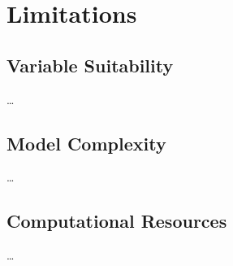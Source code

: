 
\section{Limitations}\label{sec:limitations}
    \subsection{Variable Suitability}\label{subsec:variable-suitability}
        \dots

    \subsection{Model Complexity}\label{subsec:model-complexity}
        \dots

    \subsection{Computational Resources}\label{subsec:computational-resources}
        \dots

